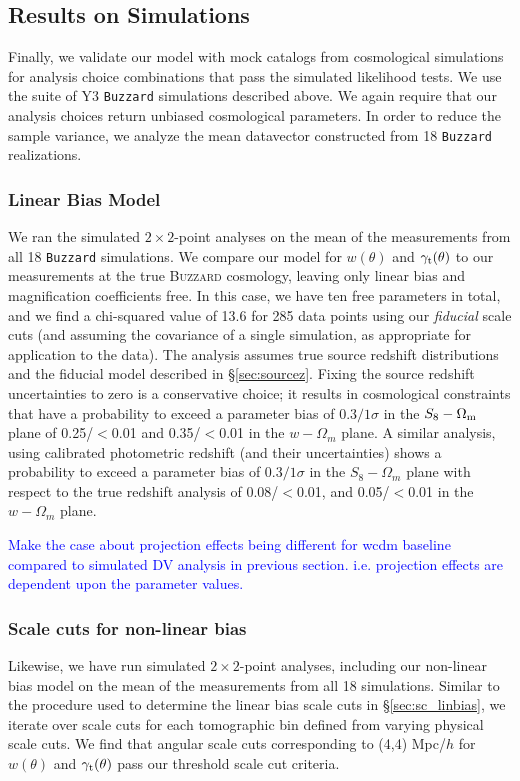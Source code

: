 \documentclass[fleqn,usenatbib]{mnras}
\newcommand{\gammat}{\ensuremath{\gamma_{\rm t}(\theta)}}
\newcommand{\wtheta}{\ensuremath{w(\theta)}}
\newcommand{\mice}{\texttt{MICE} }
\newcommand{\buzzard}{\texttt{Buzzard} }
\newcommand{\blue}[1]{\textcolor{blue}{#1}}
\newcommand{\IR}[1]{{\color{red}[\textbf{Note for IR}: #1]}}
\begin{document}
\subsection{Results on Simulations}
\label{sec:sims}
Finally, we validate our model with mock catalogs from cosmological simulations for analysis choice combinations that pass the simulated likelihood tests. We use the suite of Y3 \buzzard simulations described above. We again require that our analysis choices return unbiased cosmological parameters. In order to reduce the sample variance, we analyze the mean datavector constructed from 18 \buzzard realizations. 

\subsubsection{Linear Bias Model}
We ran the simulated $2\times 2$-point analyses on the mean of the measurements from all 18 \buzzard simulations. We compare our model for $w(\theta)$ and $\gamma_{\rm t}(\theta)$ to our measurements at the true \textsc{Buzzard} cosmology, leaving only linear bias and magnification coefficients free. In this case, we have ten free parameters in total, and we find a chi-squared value of 13.6 for 285 data points using our \textit{fiducial} scale cuts (and assuming the covariance of a single simulation, as appropriate for application to the data). The analysis assumes true source redshift distributions and the fiducial model described in \S\ref{sec:sourcez}. Fixing the source redshift uncertainties to zero is a conservative choice; it results in cosmological constraints that have a probability to exceed a parameter bias of $0.3/1\sigma$ in the $S_8-\Omega_{\rm m}$ plane of 0.25/$<$0.01 and 0.35/$<$0.01 in the $w-\Omega_{m}$ plane. A similar analysis, using calibrated photometric redshift (and their uncertainties) shows a probability to exceed a parameter bias of $0.3/1\sigma$ in the $S_8-\Omega_{m}$ plane with respect to the true redshift analysis of 0.08/$<$0.01, and 0.05/$<$0.01 in the $w-\Omega_{m}$ plane.

\blue{Make the case about projection effects being different for wcdm baseline compared to simulated DV analysis in previous section. i.e. projection effects are dependent upon the parameter values.}

\subsubsection{Scale cuts for non-linear bias}
Likewise, we have run simulated $2\times 2$-point analyses, including our non-linear bias model on the mean of the measurements from all 18 simulations. Similar to the procedure used to determine the linear bias scale cuts in \S\ref{sec:sc_linbias}, we iterate over scale cuts for each tomographic bin defined from varying physical scale cuts. We find that angular scale cuts corresponding to (4,4) Mpc/$h$ for $\wtheta$ and $\gammat$ pass our threshold scale cut criteria.  
\end{document}
